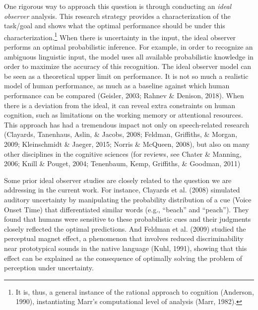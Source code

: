 \documentclass[english,floatsintext,man]{apa6}
\theoremstyle{definition}
\theoremstyle{definition}
\theoremstyle{definition}
\theoremstyle{remark}
\begin{document}
One rigorous way to approach this question is through conducting an
\emph{ideal observer} analysis. This research strategy provides a
characterization of the task/goal and shows what the optimal performance
should be under this characterization.\footnote{It is, thus, a general
  instance of the rational approach to cognition (Anderson, 1990),
  instantiating Marr's computational level of analysis (Marr, 1982).}
When there is uncertainty in the input, the ideal observer performs an
optimal probabilistic inference. For example, in order to recognize an
ambiguous linguistic input, the model uses all available probabilistic
knowledge in order to maximize the accuracy of this recognition. The
ideal observer model can be seen as a theoretical upper limit on
performance. It is not so much a realistic model of human performance,
as much as a baseline against which human performance can be compared
(Geisler, 2003; Rahnev \& Denison, 2018). When there is a deviation from
the ideal, it can reveal extra constraints on human cognition, such as
limitations on the working memory or attentional resources. This
approach has had a tremendous impact not only on speech-related research
(Clayards, Tanenhaus, Aslin, \& Jacobs, 2008; Feldman, Griffiths, \&
Morgan, 2009; Kleinschmidt \& Jaeger, 2015; Norris \& McQueen, 2008),
but also on many other disciplines in the cognitive sciences (for
reviews, see Chater \& Manning, 2006; Knill \& Pouget, 2004; Tenenbaum,
Kemp, Griffiths, \& Goodman, 2011)

Some prior ideal observer studies are closely related to the question we
are addressing in the current work. For instance, Clayards et al. (2008)
simulated auditory uncertainty by manipulating the probability
distribution of a cue (Voice Onset Time) that differentiated similar
words (e.g., \enquote{beach} and \enquote{peach}). They found that
humans were sensitive to these probabilistic cues and their judgments
closely reflected the optimal predictions. And Feldman et al. (2009)
studied the perceptual magnet effect, a phenomenon that involves reduced
discriminability near prototypical sounds in the native language (Kuhl,
1991), showing that this effect can be explained as the consequence of
optimally solving the problem of perception under uncertainty.
\end{document}

